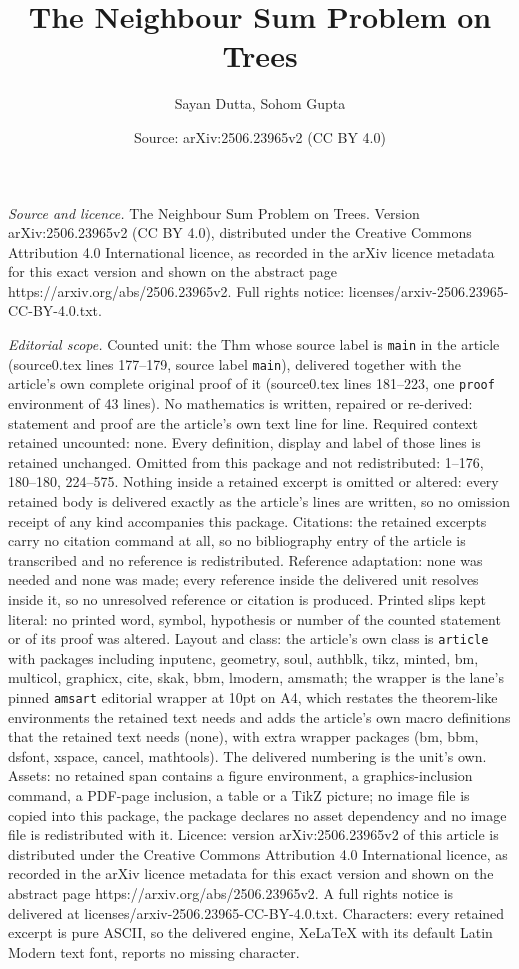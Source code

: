 \documentclass[10pt,a4paper]{amsart}
\title[The Neighbour Sum Problem on Trees]{The Neighbour Sum Problem on Trees}
\author{Sayan Dutta, Sohom Gupta}
\date{Source: arXiv:2506.23965v2 (CC BY 4.0)}
\begin{document}
\maketitle

\noindent\emph{Source and licence.} The Neighbour Sum Problem on Trees. Version arXiv:2506.23965v2 (CC BY 4.0), distributed under the Creative Commons Attribution 4.0 International licence, as recorded in the arXiv licence metadata for this exact version and shown on the abstract page https://arxiv.org/abs/2506.23965v2. Full rights notice: licenses/arxiv-2506.23965-CC-BY-4.0.txt.\par\smallskip

\noindent\textit{Editorial scope.} Counted unit: the Thm whose source label is \texttt{main} in the article (source0.tex lines 177--179, source label \texttt{main}), delivered together with the article's own complete original proof of it (source0.tex lines 181--223, one \texttt{proof} environment of 43 lines). No mathematics is written, repaired or re-derived: statement and proof are the article's own text line for line. Required context retained uncounted: none. Every definition, display and label of those lines is retained unchanged. Omitted from this package and not redistributed: 1--176, 180--180, 224--575. Nothing inside a retained excerpt is omitted or altered: every retained body is delivered exactly as the article's lines are written, so no omission receipt of any kind accompanies this package. Citations: the retained excerpts carry no citation command at all, so no bibliography entry of the article is transcribed and no reference is redistributed. Reference adaptation: none was needed and none was made; every reference inside the delivered unit resolves inside it, so no unresolved reference or citation is produced. Printed slips kept literal: no printed word, symbol, hypothesis or number of the counted statement or of its proof was altered. Layout and class: the article's own class is \texttt{article} with packages including inputenc, geometry, soul, authblk, tikz, minted, bm, multicol, graphicx, cite, skak, bbm, lmodern, amsmath; the wrapper is the lane's pinned \texttt{amsart} editorial wrapper at 10pt on A4, which restates the theorem-like environments the retained text needs and adds the article's own macro definitions that the retained text needs (none), with extra wrapper packages (bm, bbm, dsfont, xspace, cancel, mathtools). The delivered numbering is the unit's own. Assets: no retained span contains a figure environment, a graphics-inclusion command, a PDF-page inclusion, a table or a TikZ picture; no image file is copied into this package, the package declares no asset dependency and no image file is redistributed with it. Licence: version arXiv:2506.23965v2 of this article is distributed under the Creative Commons Attribution 4.0 International licence, as recorded in the arXiv licence metadata for this exact version and shown on the abstract page https://arxiv.org/abs/2506.23965v2. A full rights notice is delivered at licenses/arxiv-2506.23965-CC-BY-4.0.txt. Characters: every retained excerpt is pure ASCII, so the delivered engine, XeLaTeX with its default Latin Modern text font, reports no missing character.
\end{document}
